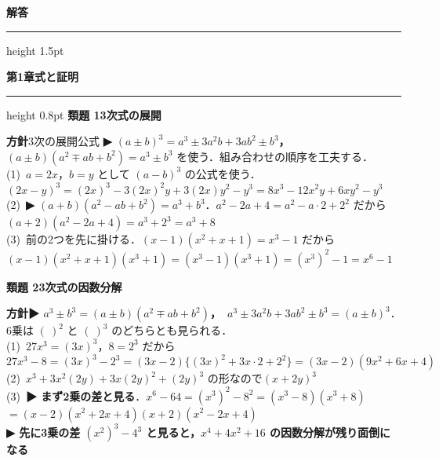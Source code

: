 \documentclass[a4paper,11pt]{ltjsarticle}
\newcommand{\ans}[2]{\Needspace{5\baselineskip}\vspace{6pt}%
  {\sffamily\bfseries 類題 #1\quad #2}\par}
\newcommand{\point}[1]{\textsf{\bfseries ▶ #1}}
\newcommand{\shouans}[2]{\Needspace{8\baselineskip}\vspace{10pt}\markboth{解答\quad #1\quad #2}{}%
  {\sffamily\bfseries\Large #1\quad #2\par}\vspace{2pt}\hrule height 0.8pt\vspace{2pt}}
\begin{document}
\clearpage
{\sffamily\bfseries\Huge 解答\par}\vspace{4pt}\hrule height 1.5pt
\shouans{第1章}{式と証明}
\ans{1}{3次式の展開}
\begin{kai}
\textbf{方針}\quad 3次の展開公式 \point{$(a\pm b)^3=a^3\pm3a^2b+3ab^2\pm b^3$，\ $(a\pm b)(a^2\mp ab+b^2)=a^3\pm b^3$} を使う．組み合わせの順序を工夫する．\\[2pt]
(1)\ $a=2x$，$b=y$ として $(a-b)^3$ の公式を使う．\\
\hspace*{1.5em}$(2x-y)^3=(2x)^3-3(2x)^2y+3(2x)y^2-y^3=8x^3-12x^2y+6xy^2-y^3$\\[2pt]
(2)\ \point{$(a+b)(a^2-ab+b^2)=a^3+b^3$}．$a^2-2a+4=a^2-a\cdot2+2^2$ だから\\
\hspace*{1.5em}$(a+2)(a^2-2a+4)=a^3+2^3=a^3+8$\\[2pt]
(3)\ 前の2つを先に掛ける．$(x-1)(x^2+x+1)=x^3-1$ だから\\
\hspace*{1.5em}$(x-1)(x^2+x+1)(x^3+1)=(x^3-1)(x^3+1)=(x^3)^2-1=x^6-1$
\end{kai}

\ans{2}{3次式の因数分解}
\begin{kai}
\textbf{方針}\quad \point{$a^3\pm b^3=(a\pm b)(a^2\mp ab+b^2)$，\ $a^3\pm3a^2b+3ab^2\pm b^3=(a\pm b)^3$}．6乗は $(\ )^2$ と $(\ )^3$ のどちらとも見られる．\\[2pt]
(1)\ $27x^3=(3x)^3$，$8=2^3$ だから\\
\hspace*{1.5em}$27x^3-8=(3x)^3-2^3=(3x-2)\{(3x)^2+3x\cdot2+2^2\}=(3x-2)(9x^2+6x+4)$\\[2pt]
(2)\ $x^3+3x^2(2y)+3x(2y)^2+(2y)^3$ の形なので\quad $(x+2y)^3$\\[2pt]
(3)\ \point{まず2乗の差と見る}．$x^6-64=(x^3)^2-8^2=(x^3-8)(x^3+8)$\\
\hspace*{1.5em}$=(x-2)(x^2+2x+4)(x+2)(x^2-2x+4)$\\
\hspace*{1.5em}\point{先に3乗の差 $(x^2)^3-4^3$ と見ると，$x^4+4x^2+16$ の因数分解が残り面倒になる}
\end{kai}
\end{document}
